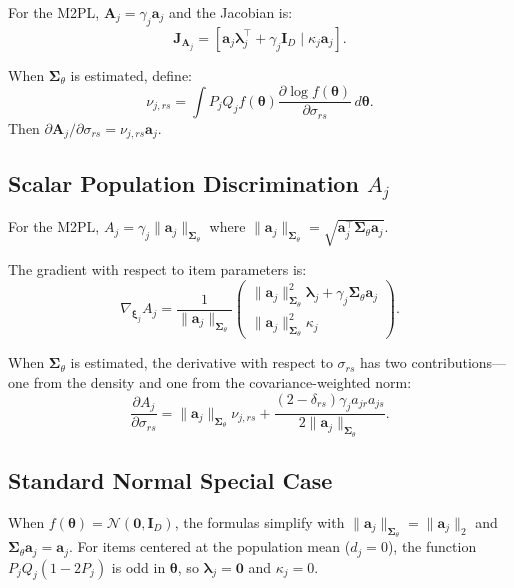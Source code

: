 \documentclass[man, 12pt, floatsintext]{apa7}
\begin{document}
For the M2PL, $\mathbf{A}_j = \gamma_j \mathbf{a}_j$ and the Jacobian is:
$$\mathbf{J}_{\mathbf{A}_j} = \left[\mathbf{a}_j \boldsymbol{\lambda}_j^\top + \gamma_j \mathbf{I}_D \;\Big|\; \kappa_j \mathbf{a}_j\right].$$

When $\boldsymbol{\Sigma}_\theta$ is estimated, define:
$$\nu_{j,rs} = \int P_j Q_j f(\boldsymbol{\theta}) \frac{\partial \log f(\boldsymbol{\theta})}{\partial \sigma_{rs}}\, d\boldsymbol{\theta}.$$
Then $\partial \mathbf{A}_j/\partial \sigma_{rs} = \nu_{j,rs} \mathbf{a}_j$.

\subsection{Scalar Population Discrimination $A_j$}

For the M2PL, $A_j = \gamma_j \|\mathbf{a}_j\|_{\boldsymbol{\Sigma}_\theta}$ where $\|\mathbf{a}_j\|_{\boldsymbol{\Sigma}_\theta} = \sqrt{\mathbf{a}_j^\top \boldsymbol{\Sigma}_\theta \mathbf{a}_j}$.

The gradient with respect to item parameters is:
\begin{equation}\label{eq:m2pl-grad-A-final}
\nabla_{\boldsymbol{\xi}_j} A_j = \frac{1}{\|\mathbf{a}_j\|_{\boldsymbol{\Sigma}_\theta}} \begin{pmatrix} \|\mathbf{a}_j\|_{\boldsymbol{\Sigma}_\theta}^2 \boldsymbol{\lambda}_j + \gamma_j \boldsymbol{\Sigma}_\theta \mathbf{a}_j \\ \|\mathbf{a}_j\|_{\boldsymbol{\Sigma}_\theta}^2 \kappa_j \end{pmatrix}.
\end{equation}

When $\boldsymbol{\Sigma}_\theta$ is estimated, the derivative with respect to $\sigma_{rs}$ has two contributions---one from the density and one from the covariance-weighted norm:
\begin{equation}\label{eq:m2pl-grad-A-cov}
\frac{\partial A_j}{\partial \sigma_{rs}} = \|\mathbf{a}_j\|_{\boldsymbol{\Sigma}_\theta} \nu_{j,rs} + \frac{(2-\delta_{rs})\gamma_j a_{jr} a_{js}}{2\|\mathbf{a}_j\|_{\boldsymbol{\Sigma}_\theta}}.
\end{equation}

\subsection{Standard Normal Special Case}

When $f(\boldsymbol{\theta}) = \mathcal{N}(\mathbf{0}, \mathbf{I}_D)$, the formulas simplify with $\|\mathbf{a}_j\|_{\boldsymbol{\Sigma}_\theta} = \|\mathbf{a}_j\|_2$ and $\boldsymbol{\Sigma}_\theta \mathbf{a}_j = \mathbf{a}_j$. For items centered at the population mean ($d_j = 0$), the function $P_j Q_j (1-2P_j)$ is odd in $\boldsymbol{\theta}$, so $\boldsymbol{\lambda}_j = \mathbf{0}$ and $\kappa_j = 0$.
\end{document}
